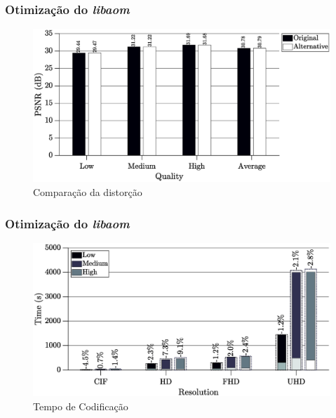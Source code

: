 \documentclass{beamer}
\begin{document}
\begin{frame}
       \frametitle{Otimização do \emph{libaom}}       
       \begin{center}
                     \begin{figure}[h]
                            \centering
                            \includegraphics[width=\textwidth]{Figures/buttmultqual.eps}
                            \caption{Comparação da distorção}
                     \end{figure}
       \end{center}
\end{frame}

\begin{frame}
       \frametitle{Otimização do \emph{libaom}}       
       \begin{center}
                     \begin{figure}[h]
                            \centering
                            \includegraphics[width=\textwidth]{Figures/buttmulttime.eps}
                            \caption{Tempo de Codificação}
                     \end{figure}
       \end{center}
\end{frame}
\end{document}
